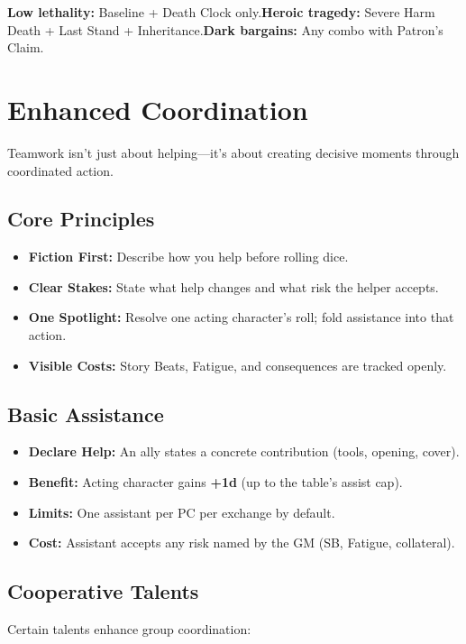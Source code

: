\begin{tcolorbox}[title={Quick Picks},colback=gray!5,colframe=black]
\small \textbf{Low lethality:} Baseline + Death Clock only.\quad \textbf{Heroic tragedy:} Severe Harm Death + Last Stand + Inheritance.\quad \textbf{Dark bargains:} Any combo with Patron’s Claim.
\end{tcolorbox}

\section{Enhanced Coordination}

Teamwork isn't just about helping—it's about creating decisive moments through coordinated action.

\subsection{Core Principles}
\begin{itemize}
  \item \textbf{Fiction First:} Describe how you help before rolling dice.
  \item \textbf{Clear Stakes:} State what help changes and what risk the helper accepts.
  \item \textbf{One Spotlight:} Resolve one acting character's roll; fold assistance into that action.
  \item \textbf{Visible Costs:} Story Beats, Fatigue, and consequences are tracked openly.
\end{itemize}

\subsection{Basic Assistance}
\begin{itemize}
  \item \textbf{Declare Help:} An ally states a concrete contribution (tools, opening, cover).
  \item \textbf{Benefit:} Acting character gains \textbf{+1d} (up to the table's assist cap).
  \item \textbf{Limits:} One assistant per PC per exchange by default.
  \item \textbf{Cost:} Assistant accepts any risk named by the GM (SB, Fatigue, collateral).
\end{itemize}

\subsection{Cooperative Talents}
Certain talents enhance group coordination:

